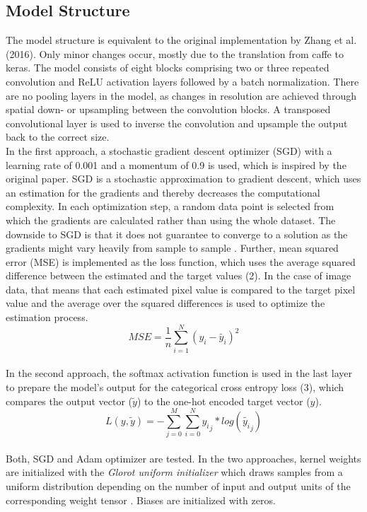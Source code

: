 \documentclass[12pt,letterpaper]{article}
\begin{document}
\subsection{Model Structure}
The model structure is equivalent to the original implementation by Zhang et al. (2016). Only minor changes occur, mostly due to the translation from caffe to keras. The model consists of eight blocks comprising two or three repeated convolution and ReLU activation layers followed by a batch normalization. There are no pooling layers in the model, as changes  in  resolution  are  achieved  through  spatial  down-  or  upsampling between the convolution blocks. A transposed convolutional layer is used to inverse the convolution and upsample the output back to the correct size.\\
In the first approach, a stochastic gradient descent optimizer (SGD) with a learning rate of 0.001 and a momentum of 0.9 is used, which is inspired by the original paper. SGD is a stochastic approximation to gradient descent, which uses an estimation for the gradients and thereby decreases the computational complexity. In each optimization step, a random data point is selected from which the gradients are calculated rather than using the whole dataset. The downside to SGD is that it does not guarantee to converge to a solution as the gradients might vary heavily from sample to sample \citep{Lecture.2019}. Further,  mean squared error (MSE) is implemented as the loss function, which uses the average squared difference between the estimated and the target values (2). In the case of image data, that means that each estimated pixel value is compared to the target pixel value and the average over the squared differences is used to optimize the estimation process.
\begin{equation}
MSE = \frac{1}{n}\sum_{i=1}^N(y_i - \tilde{y_i})^2
\end{equation}
\\
In the second approach, the softmax activation function is used in the last layer to prepare the model’s output for the categorical cross entropy loss (3), which compares the output vector ($\tilde{y}$) to the one-hot encoded target vector ($y$).
\begin{equation}
L(y,\tilde{y}) = -\sum_{j=0}^M \sum_{i=0}^N
{{y_i}_j}*log({\tilde{y_i}_j})
\end{equation}
\\
Both, SGD and Adam optimizer are tested. In the two approaches, kernel weights are initialized with the \emph{Glorot uniform initializer} which draws samples from a uniform distribution depending on the number of input and output units of the corresponding weight tensor \citep{Glorot2010}. Biases are initialized with zeros.
\end{document}
